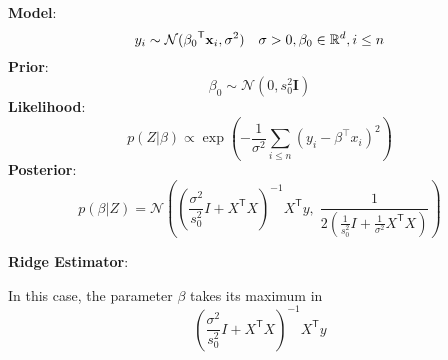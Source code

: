 \begin{examplesection}
    \textbf{Model}:
    \noindent\begin{equation*}
        y_i  \sim \mathcal{N}({\beta_0}^{\mathsf{T}}\mathbf{x}_i, \sigma^2)\quad \sigma>0, \beta_0\in \mathbb{R}^d, i\leq n \\
    \end{equation*}
    \textbf{Prior}:
    \noindent\begin{equation*}
        \beta_0\sim\mathcal{N}(0,s_0^2 \mathbf{I}    )
    \end{equation*}
    \textbf{Likelihood}:
    \noindent\begin{equation*}
        p(Z|\beta)\propto\exp\left(-\frac{1}{\sigma^{2}}\sum_{i\leq n}{(y_{i}-\beta^{\top}x_{i})}^{2}\right)
    \end{equation*}
    \textbf{Posterior}:
    \noindent\begin{equation*}
        p(\beta|Z)=\mathcal{N}\left({{\left(\frac{\sigma^{2}}{s_{0}^{2}}I+X^{\mathsf{T}}X\right)}^{-1}X^{\mathsf{T}}y,\;\frac{1}{2({\frac{1}{s_{0}^{2}}I+\frac{1}{\sigma^{2}}X^{\mathsf{T}}X})}}\right)
    \end{equation*}

    \textbf{Ridge Estimator}:

    In this case, the parameter $\beta$ takes its maximum in
    \noindent\begin{equation*}
        {\left(\frac{\sigma^{2}}{s_{0}^{2}}I+X^{\mathsf{T}}X\right)}^{-1}X^{\mathsf{T}}y
    \end{equation*}
\end{examplesection}